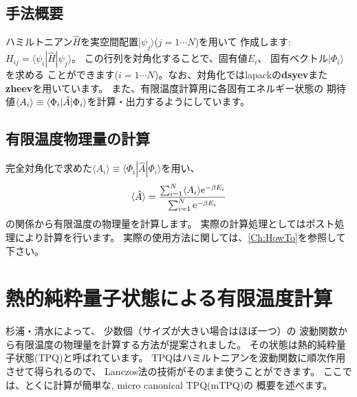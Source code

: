 \subsection{手法概要}
ハミルトニアン${\hat{H}}$を実空間配置$| \psi_j \rangle$($j=1\cdots N$)を用いて
作成します: $H_{ij}= \langle \psi_i | {\hat H} | \psi_j \rangle$。
この行列を対角化することで、固有値$E_i$、 固有ベクトル$|\Phi_i\rangle$を求める
ことができます($i=1 \cdots N$)。なお、対角化ではlapackの{\bf dsyev}また
{\bf zheev}を用いています。
また、有限温度計算用に各固有エネルギー状態の
期待値$\langle A_i\rangle \equiv \langle \Phi_i | {\hat A} | \Phi_i\rangle$を計算・出力するようにしています。
\subsection{有限温度物理量の計算}
完全対角化で求めた$\langle A_i\rangle \equiv \langle \Phi_i | {\hat A} | \Phi_i\rangle$を用い、
\begin{equation}
\langle {\hat A}\rangle=\frac{\sum_{i=1}^N \langle A_i\rangle {\rm  e}^{-\beta E_i}}{\sum_{i=1}^N{\rm  e}^{-\beta E_i}}
\end{equation}
の関係から有限温度の物理量を計算します。
実際の計算処理としてはポスト処理により計算を行います。
実際の使用方法に関しては、\ref{Ch:HowTo}を参照して下さい。

\section{熱的純粋量子状態による有限温度計算}
\label{Ch:TPQ}
杉浦・清水によって、
少数個（サイズが大きい場合はほぼ一つ）の
波動関数から有限温度の物理量を計算する方法が提案されました\cite{Sugiura2012}。
その状態は熱的純粋量子状態(TPQ)と呼ばれています。
TPQはハミルトニアンを波動関数に順次作用させて得られるので、
Lanczos法の技術がそのまま使うことができます。
ここでは、とくに計算が簡単な, micro canonical TPQ(mTPQ)の
概要を述べます。

